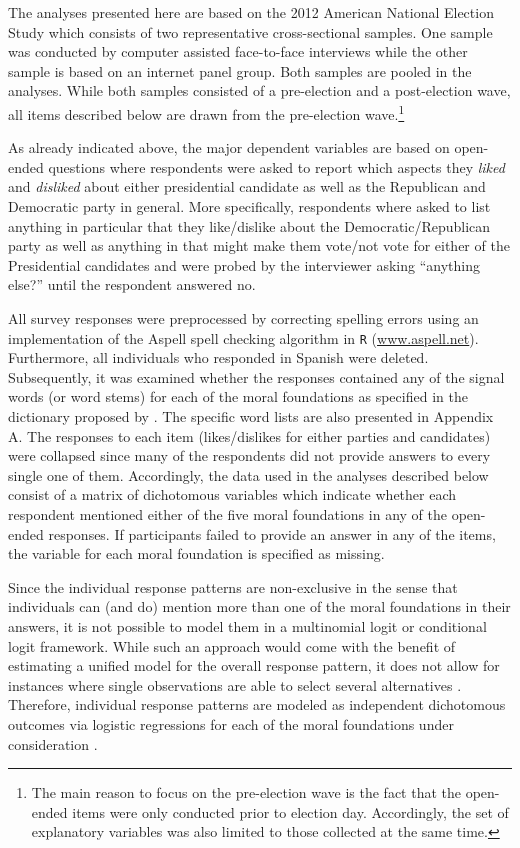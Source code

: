 \documentclass[12pt]{paper}
\begin{document}
The analyses presented here are based on the 2012 American National Election Study which consists of two representative cross-sectional samples. One sample was conducted by computer assisted face-to-face interviews while the other sample is based on an internet panel group. Both samples are pooled in the analyses. While both samples consisted of a pre-election and a post-election wave, all items described below are drawn from the pre-election wave.\footnote{The main reason to focus on the pre-election wave is the fact that the open-ended items were only conducted prior to election day. Accordingly, the set of explanatory variables was also limited to those collected at the same time.}

As already indicated above, the major dependent variables are based on open-ended questions where respondents were asked to report which aspects they \textit{liked} and \textit{disliked} about either presidential candidate as well as the Republican and Democratic party in general. More specifically, respondents where asked to list anything in particular that they like/dislike about the Democratic/Republican party as well as anything in that might make them vote/not vote for either of the Presidential candidates and were probed by the interviewer asking ``anything else?'' until the respondent answered no.

All survey responses were preprocessed by correcting spelling errors using an implementation of the Aspell spell checking algorithm in \texttt{R} (\url{www.aspell.net}). Furthermore, all individuals who responded in Spanish were deleted. Subsequently, it was examined whether the responses contained any of the signal words (or word stems) for each of the moral foundations as specified in the dictionary proposed by \citet{graham2009liberals}. The specific word lists are also presented in Appendix A. The responses to each item (likes/dislikes for either parties and candidates) were collapsed since many of the respondents did not provide answers to every single one of them. Accordingly, the data used in the analyses described below consist of a matrix of dichotomous variables which indicate whether each respondent mentioned either of the five moral foundations in any of the open-ended responses. If participants failed to provide an answer in any of the items, the variable for each moral foundation is specified as missing.

Since the individual response patterns are non-exclusive in the sense that individuals can (and do) mention more than one of the moral foundations in their answers, it is not possible to model them in a multinomial logit or conditional logit framework. While such an approach would come with the benefit of estimating a unified model for the overall response pattern, it does not allow for instances where single observations are able to select several alternatives \citep[but see][]{gilbert2007models}. Therefore, individual response patterns are modeled as independent dichotomous outcomes via logistic regressions for each of the moral foundations under consideration \citep[c.f. for example][]{agresti1999modeling}.
\end{document}
